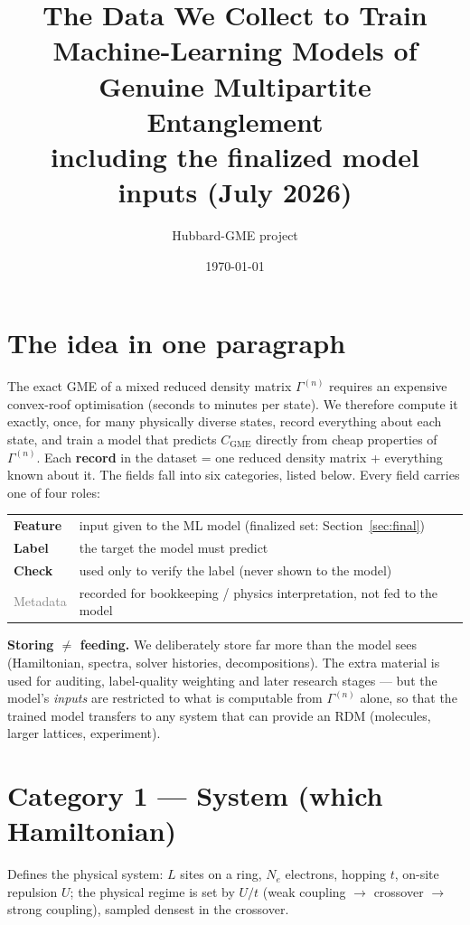 \documentclass[11pt]{article}
\title{\textbf{The Data We Collect to Train Machine-Learning Models of
       Genuine Multipartite Entanglement}\\[4pt]
       \large including the finalized model inputs (July 2026)}
\author{Hubbard-GME project}
\date{\today}
\newcommand{\CGME}{\ensuremath{C_{\mathrm{GME}}}}
\newcommand{\rdm}{\ensuremath{\Gamma^{(n)}}}
\newcommand{\feat}{\textcolor{blue!60!black}{\textbf{Feature}}}
\newcommand{\lab}{\textcolor{red!60!black}{\textbf{Label}}}
\newcommand{\chk}{\textcolor{orange!70!black}{\textbf{Check}}}
\newcommand{\meta}{\textcolor{gray}{Metadata}}
\begin{document}
\maketitle
\tableofcontents
\bigskip

\section{The idea in one paragraph}
The exact GME of a mixed reduced density matrix \rdm{} requires an expensive
convex-roof optimisation (seconds to minutes per state). We therefore compute
it exactly, once, for many physically diverse states, record everything about
each state, and train a model that predicts \CGME{} directly from cheap
properties of \rdm. Each \textbf{record} in the dataset = one reduced density
matrix + everything known about it. The fields fall into six categories,
listed below. Every field carries one of four roles:

\begin{center}
\begin{tabular}{@{}ll@{}}
\toprule
\feat{}  & input given to the ML model (finalized set: Section~\ref{sec:final}) \\
\lab{}   & the target the model must predict \\
\chk{}   & used only to verify the label (never shown to the model) \\
\meta{}  & recorded for bookkeeping / physics interpretation, not fed to the model \\
\bottomrule
\end{tabular}
\end{center}

\noindent\textbf{Storing $\ne$ feeding.} We deliberately store far more than
the model sees (Hamiltonian, spectra, solver histories, decompositions). The
extra material is used for auditing, label-quality weighting and later
research stages --- but the model's \emph{inputs} are restricted to what is
computable from \rdm{} alone, so that the trained model transfers to any
system that can provide an RDM (molecules, larger lattices, experiment).

\section{Category 1 --- System (which Hamiltonian)}
Defines the physical system: $L$ sites on a ring, $N_e$ electrons, hopping
$t$, on-site repulsion $U$; the physical regime is set by $U/t$ (weak
coupling $\to$ crossover $\to$ strong coupling), sampled densest in the
crossover.
\end{document}
